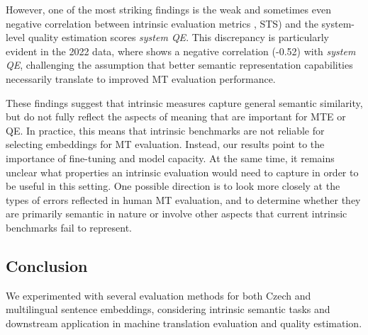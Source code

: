 However, one of the most striking findings is the weak and sometimes even negative correlation between intrinsic evaluation metrics \costraminus, STS) and the system-level quality estimation scores \emph{system QE}. This discrepancy is particularly evident in the 2022 data, where \costraminus shows a negative correlation (-0.52) with \emph{system QE}, challenging the assumption that better semantic representation capabilities necessarily translate to improved MT evaluation performance.

These findings suggest that intrinsic measures capture general semantic similarity, but do not fully reflect the aspects of meaning that are important for MTE or QE. In practice, this means that intrinsic benchmarks are not reliable for selecting embeddings for MT evaluation. Instead, our results point to the importance of fine-tuning and model capacity. At the same time, it remains unclear what properties an intrinsic evaluation would need to capture in order to be useful in this setting. One possible direction is to look more closely at the types of errors reflected in human MT evaluation, and to determine whether they are primarily semantic in nature or involve other aspects that current intrinsic benchmarks fail to represent.

\subsection{Conclusion}
We experimented with several evaluation methods for both Czech and multilingual sentence embeddings, considering intrinsic semantic tasks and downstream application in machine translation evaluation and quality estimation.

